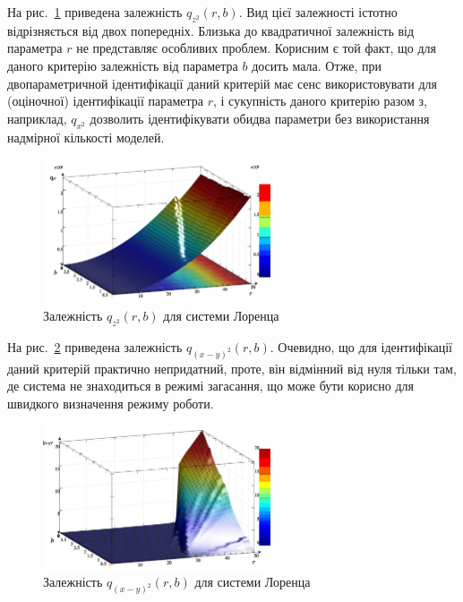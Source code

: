 На рис.~\ref{atu:f:lor_qz2_r_b} приведена залежність
$q_{z^2}(r,b)$.
Вид цієї залежності істотно відрізняється від двох попередніх.
Близька до квадратичної залежність від параметра $r$ не представляє особливих
проблем. Корисним є той факт, що для даного критерію залежність від параметра $b$
досить мала. Отже, при двопараметричной ідентифікації даний критерій має
сенс використовувати для (оціночної) ідентифікації параметра $r$, і
сукупність даного критерію разом з, наприклад, $q_{x^2}$ дозволить
ідентифікувати обидва параметри без використання надмірної кількості моделей.

\begin{figure}[ht!]
  \centerline{  \includegraphics[width=0.60\textwidth]{p/cha/lor/q2d/lor_qz2_r_b.png}  }
  \caption{Залежність $ q_{z^2} (r, b) $ для системи Лоренца}
  \label{atu:f:lor_qz2_r_b}
\end{figure}

На рис.~\ref{atu:f:lor_qxmy2_r_b} приведена залежність
$q_{(x-y)^2}(r,b)$.
Очевидно, що для ідентифікації даний критерій практично
непридатний, проте, він відмінний від нуля тільки там, де система
не знаходиться в режимі загасання, що може бути корисно для
швидкого визначення режиму роботи.

\begin{figure}[ht!]
  \centerline{  \includegraphics[width=0.60\textwidth]{p/cha/lor/q2d/lor_qxmy2_r_b.png}  }
  \caption{Залежність $ q_{(x-y)^2} (r, b) $ для системи Лоренца}
  \label{atu:f:lor_qxmy2_r_b}
\end{figure}


